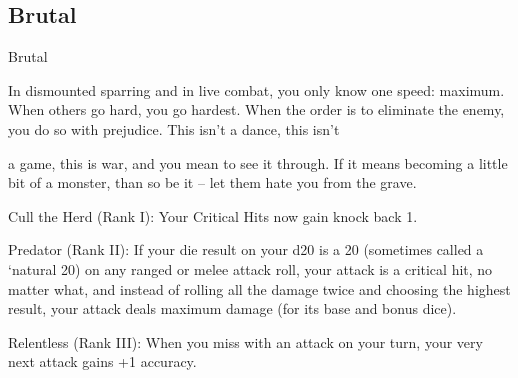 \subsection{Brutal}

                                                      Brutal  

In dismounted sparring and in live combat, you only know one speed: maximum. When others go hard, you  
go hardest. When the order is to eliminate the enemy, you do so with prejudice. This isn’t a dance, this isn’t  

a game, this is war, and you mean to see it through. If it means becoming a little bit of a monster, than so  
be it -- let them hate you from the grave.   

                                                                                                                  


Cull the Herd (Rank I): Your Critical Hits now gain knock back 1.
 
Predator (Rank II): If your die result on your d20 is a 20 (sometimes called a ‘natural 20) on any  
ranged or melee attack roll, your attack is a critical hit, no matter what, and instead of rolling all  
the damage twice and choosing the highest result, your attack deals maximum damage (for its  
base and bonus dice).
 
Relentless (Rank III): When you miss with an attack on your turn, your very next attack gains +1  
accuracy.